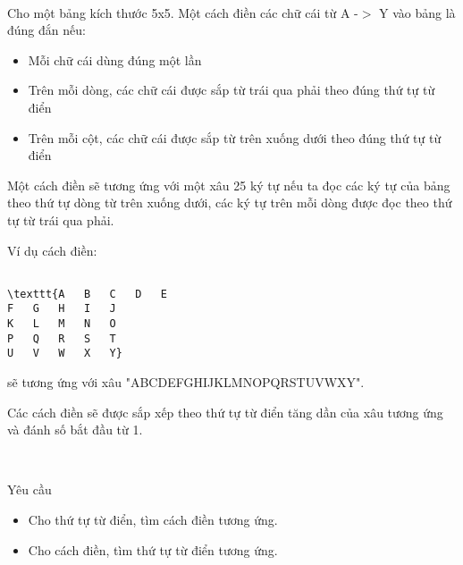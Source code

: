  

Cho một bảng kích thước 5x5. Một cách điền các chữ cái từ A -$>$ Y vào bảng là đúng đắn nếu:
\begin{itemize}
	\item Mỗi chữ cái dùng đúng một lần
	\item Trên mỗi dòng, các chữ cái được sắp từ trái qua phải theo đúng thứ tự từ điển
	\item Trên mỗi cột, các chữ cái được sắp từ trên xuống dưới theo đúng thứ tự từ điển
\end{itemize}

Một cách điền sẽ tương ứng với một xâu 25 ký tự nếu ta đọc các ký tự của bảng theo thứ tự dòng từ trên xuống dưới, các ký tự trên mỗi dòng được đọc theo thứ tự từ trái qua phải.

Ví dụ cách điền:
\begin{verbatim}

\texttt{A	B	C	D	E
F	G	H	I	J
K	L	M	N	O
P	Q	R	S	T
U	V	W	X	Y}\end{verbatim}

sẽ tương ứng với xâu "ABCDEFGHIJKLMNOPQRSTUVWXY".

Các cách điền sẽ được sắp xếp theo thứ tự từ điển tăng dần của xâu tương ứng và đánh số bắt đầu từ 1.

 

Yêu cầu
\begin{itemize}
	\item Cho thứ tự từ điển, tìm cách điền tương ứng.
	\item Cho cách điền, tìm thứ tự từ điển tương ứng.
\end{itemize}